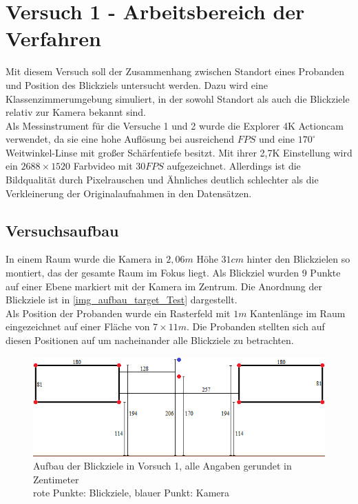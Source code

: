 \section{Versuch 1 - Arbeitsbereich der Verfahren}
\label{Versuch_1}
Mit diesem Versuch soll der Zusammenhang zwischen Standort eines Probanden und Position des Blickziels untersucht werden. Dazu wird eine Klassenzimmerumgebung simuliert, in der sowohl Standort als auch die Blickziele relativ zur Kamera bekannt sind.\\
Als Messinstrument für die Versuche 1 und 2 wurde die Explorer 4K Actioncam verwendet, da sie eine hohe Auflösung bei ausreichend $FPS$ und eine $170^\circ$ Weitwinkel-Linse mit großer Schärfentiefe besitzt. Mit ihrer 2,7K Einstellung wird ein $2688 \times 1520$ Farbvideo mit $30FPS$ aufgezeichnet.
\newpage
Allerdings ist die Bildqualität durch Pixelrauschen und Ähnliches deutlich schlechter als die Verkleinerung der Originalaufnahmen in den Datensätzen.
\subsection{Versuchsaufbau}
In einem Raum wurde die Kamera in $2,06m$ Höhe $31cm$ hinter den Blickzielen so montiert, das der gesamte Raum im Fokus liegt. Als Blickziel wurden 9 Punkte auf einer Ebene markiert mit der Kamera im Zentrum. Die Anordnung der Blickziele ist in \autoref{img_aufbau_target_Test} dargestellt.\\
Als Position der Probanden wurde ein Rasterfeld mit $1m$ Kantenlänge im Raum eingezeichnet auf einer Fläche von $7 \times 11m$. Die Probanden stellten sich auf diesen Positionen auf um nacheinander alle Blickziele zu betrachten. 
\begin{figure}
	\centering
	\includegraphics[width=\linewidth]{img/Target}
	\caption{Aufbau der Blickziele in Vorsuch 1, alle Angaben gerundet in Zentimeter\\rote Punkte: Blickziele, blauer Punkt: Kamera}
	\label{img_aufbau_target_Test}
\end{figure}
